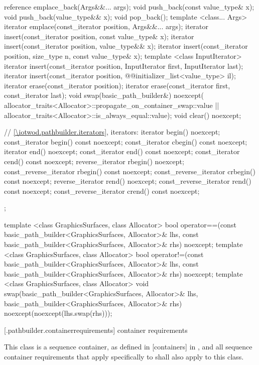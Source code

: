 \begin{codeblock}
{{    reference emplace_back(Args&&... args);
    void push_back(const value_type& x);
    void push_back(value_type&& x);
    void pop_back();
    template <class... Args>
    iterator emplace(const_iterator position, Args&&... args);
    iterator insert(const_iterator position, const value_type& x);
    iterator insert(const_iterator position, value_type&& x);
    iterator insert(const_iterator position, size_type n, const value_type& x);
    template <class InputIterator>
    iterator insert(const_iterator position, InputIterator first, InputIterator last);
    iterator insert(const_iterator position,
    @\stdqualifier{}@initializer_list<value_type> il);
    iterator erase(const_iterator position);
    iterator erase(const_iterator first, const_iterator last);
    void swap(basic_path_builder&) noexcept(
      allocator_traits<Allocator>::propagate_on_container_swap::value ||
      allocator_traits<Allocator>::is_always_equal::value);
    void clear() noexcept;

    // \ref{\iotwod.pathbuilder.iterators}, iterators:
    iterator begin() noexcept;
    const_iterator begin() const noexcept;
    const_iterator cbegin() const noexcept;
    iterator end() noexcept;
    const_iterator end() const noexcept;
    const_iterator cend() const noexcept;
    reverse_iterator rbegin() noexcept;
    const_reverse_iterator rbegin() const noexcept;
    const_reverse_iterator crbegin() const noexcept;
    reverse_iterator rend() noexcept;
    const_reverse_iterator rend() const noexcept;
    const_reverse_iterator crend() const noexcept;
  };

  template <class GraphicsSurfaces, class Allocator>
  bool operator==(const basic_path_builder<GraphicsSurfaces, Allocator>& lhs,
    const basic_path_builder<GraphicsSurfaces, Allocator>& rhs) noexcept;
  template <class GraphicsSurfaces, class Allocator>
  bool operator!=(const basic_path_builder<GraphicsSurfaces, Allocator>& lhs,
    const basic_path_builder<GraphicsSurfaces, Allocator>& rhs) noexcept;
  template <class GraphicsSurfaces, class Allocator>
  void swap(basic_path_builder<GraphicsSurfaces, Allocator>& lhs,
    basic_path_builder<GraphicsSurfaces, Allocator>& rhs) noexcept(noexcept(lhs.swap(rhs)));
}
\end{codeblock}

 [\iotwod.pathbuilder.containerrequirements] { container requirements}

\pnum
This class is a sequence container, as defined in [containers] in \CppXVII, and all sequence container requirements that apply specifically to  shall also apply to this class.

